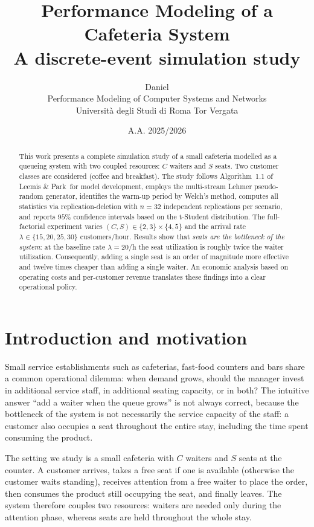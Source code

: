 \documentclass[11pt,a4paper]{article}
\title{Performance Modeling of a Cafeteria System \\
       \large A discrete-event simulation study}
\author{Daniel \\ Performance Modeling of Computer Systems and Networks \\
        Universit\`a degli Studi di Roma Tor Vergata}
\date{A.A. 2025/2026}
\begin{document}
\maketitle

\begin{abstract}
This work presents a complete simulation study of a small cafeteria
modelled as a queueing system with two coupled resources: $C$ waiters
and $S$ seats. Two customer classes are considered (coffee and
breakfast). The study follows Algorithm~1.1 of Leemis \&
Park\,\cite{leemis_park} for model development, employs the
multi-stream Lehmer pseudo-random generator, identifies the warm-up
period by Welch's method, computes all statistics via
replication-deletion with $n=32$ independent replications per scenario,
and reports $95\%$ confidence intervals based on the t-Student
distribution. The full-factorial experiment varies
$(C,S) \in \{2,3\} \times \{4,5\}$ and the arrival rate
$\lambda \in \{15,20,25,30\}$ customers/hour. Results show that
\emph{seats are the bottleneck of the system}: at the baseline rate
$\lambda=20$/h the seat utilization is roughly twice the waiter
utilization. Consequently, adding a single seat is an order of
magnitude more effective and twelve times cheaper than adding a single
waiter. An economic analysis based on operating costs and per-customer
revenue translates these findings into a clear operational policy.
\end{abstract}

\tableofcontents
\newpage

\section{Introduction and motivation}

Small service establishments such as cafeterias, fast-food counters
and bars share a common operational dilemma: when demand grows, should
the manager invest in additional service staff, in additional seating
capacity, or in both? The intuitive answer ``add a waiter when the
queue grows'' is not always correct, because the bottleneck of the
system is not necessarily the service capacity of the staff: a customer
also occupies a seat throughout the entire stay, including the time
spent consuming the product.

The setting we study is a small cafeteria with $C$ waiters and $S$
seats at the counter. A customer arrives, takes a free seat if one is
available (otherwise the customer waits standing), receives attention
from a free waiter to place the order, then consumes the product still
occupying the seat, and finally leaves. The system therefore couples
two resources: waiters are needed only during the attention phase,
whereas seats are held throughout the whole stay.
\end{document}
